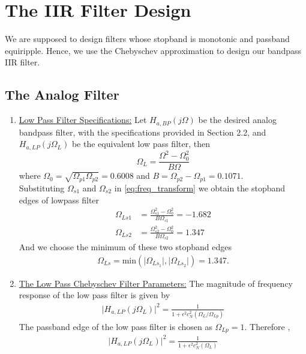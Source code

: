 \documentclass[journal,12pt,twocolumn]{IEEEtran}
\theoremstyle{remark}
\begin{document}
\section{\textbf{The IIR Filter Design}}
We are supposed to design filters whose stopband is monotonic and passband equiripple.  
Hence, we use the Chebyschev approximation to design our bandpass IIR filter.
\subsection{\textbf{The Analog Filter}}
\begin{enumerate}

\item \underline{Low Pass Filter Specifications:}  Let $H_{a, BP}(j\Omega)$ be the desired analog bandpass filter,  with the specifications provided in Section 2.2, and $H_{a,LP}(j\Omega_L)$ be the equivalent low pass filter, then
\begin{equation}
\Omega_L = \frac{\Omega^2 - \Omega_0^2}{B\Omega} \label{eq:freq_transform}
\end{equation}
where $\Omega_0 = \sqrt{\Omega_{p1}\Omega_{p2}} = 0.6008$ and $B = \Omega_{p2} - \Omega_{p1} = 0.1071$.\\
Substituting $\Omega_{s1}$ and $\Omega_{s2}$ in \eqref{eq:freq_transform} we obtain the stopband edges of lowpass filter 
\begin{align}
    \Omega_{Ls1} &= \frac{\Omega_{s1}^2 - \Omega_0^2}{B\Omega_{s1}} = -1.682\\
    \Omega_{Ls2} &= \frac{\Omega_{s2}^2 - \Omega_0^2}{B\Omega_{s2}} = 1.347
\end{align}
And we choose the minimum of these two stopband edges
\begin{align}
    \Omega_{Ls} = \mbox{min}(\vert \Omega_{Ls_1}\vert,\vert \Omega_{Ls_2}\vert) = 1.347.
\end{align}
\item \underline{The Low Pass Chebyschev Filter Parameters:} The magnitude of frequency response of the low pass filter is given by 
\begin{align}
    \vert H_{a,LP}(j\Omega_L)\vert^2 = \frac{1}{1 + \epsilon^2c_N^2(\Omega_L/\Omega_{Lp})} \label{eq:mag_freq_response}
\end{align}
The passband edge of the low pass filter is chosen as $\Omega_{Lp}=1$.
Therefore ,
\begin{align}
    \vert H_{a,LP}(j\Omega_L)\vert^2 = \frac{1}{1 + \epsilon^2c_N^2(\Omega_L)} \label{eq:specification}
\end{align}

\end{enumerate}
\end{document}
